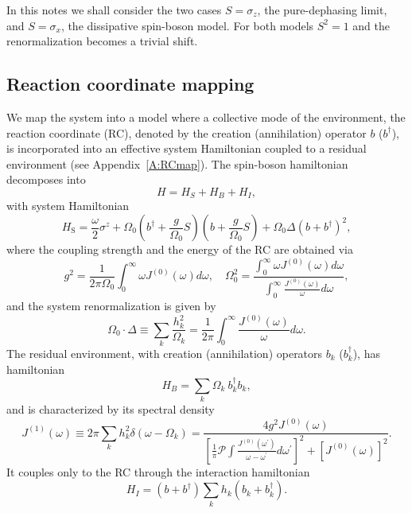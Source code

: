 \documentclass[%
preprint,
onecolumn,
notitlepag,
 amsmath,amssymb,
 aps,
 pra,
]{revtex4-2}
\begin{document}
In this notes we shall consider the two cases $S = \sigma_{z}$, the pure-dephasing limit, and $S = \sigma_{x}$, the dissipative spin-boson model. For both models $S^2 =1$ and the renormalization becomes a trivial shift.

\subsection{Reaction coordinate mapping}

We map the system  into a model where a collective mode of the environment, the reaction coordinate (RC), denoted by the creation (annihilation) operator $b$ ($b^{\dag}$), is incorporated into an effective system Hamiltonian coupled to a residual environment (see Appendix~\ref{A:RCmap}). The spin-boson hamiltonian decomposes into
\begin{equation}
H = H_{S} + H_{B} + H_{I},
\end{equation}
with system Hamiltonian
\begin{equation}
H_{\text{S}}=\frac{\omega}{2} \sigma^{z}+\Omega_{0}\left(b^{\dagger}+\frac{g}{\Omega_{0}} S\right)\left(b+\frac{g}{\Omega_{0}} S\right)+ \Omega_{0} \Delta (b + b^{\dag})^{2},
\end{equation}
where the coupling strength and the energy of the RC are obtained via
\begin{equation}
g^{2}=\frac{1}{2 \pi \Omega_{0}} \int_{0}^{\infty} \omega J^{(0)}(\omega) d \omega, 
\quad
\Omega_{0}^{2}=\frac{\int_{0}^{\infty} \omega J^{(0)}(\omega) d \omega}{\int_{0}^{\infty} \frac{J^{(0)}(\omega)}{\omega} d \omega},
\end{equation} 
and the system renormalization is given by
\begin{equation}
\Omega_{0} \cdot \Delta \equiv \sum_{k} \frac{h_{k}^{2}}{\Omega_{k}}=\frac{1}{2 \pi} \int_{0}^{\infty} \frac{J^{(0)}(\omega)}{\omega} d \omega.
\end{equation}
The residual environment, with creation (annihilation) operators $b_{k}$ ($b_{k}^{\dag}$),  has hamiltonian
\begin{equation}
H_{B}= \sum_{k} \Omega_{k}\ b_{k}^{\dagger} b_{k}, 
\end{equation}
and is characterized by its spectral density
\begin{equation}
J^{(1)}(\omega) \equiv 2 \pi \sum_{k} h_k^2 \delta(\omega-\Omega_k) = \frac{4 g^{2} J^{(0)}(\omega)}{\left[\frac{1}{\pi} \mathcal{P} \int \frac{J^{(0)}\left(\omega^{\prime}\right)}{\omega-\omega^{\prime}} d \omega^{\prime}\right]^{2}+\left[J^{(0)}(\omega)\right]^{2}}.
\end{equation}
It couples only to the RC through the interaction hamiltonian
\begin{equation}
H_{I} = (b + b^{\dag}) \sum_{k} h_{k} (b_{k} + b_{k}^{\dagger}). 
\end{equation}
\end{document}
